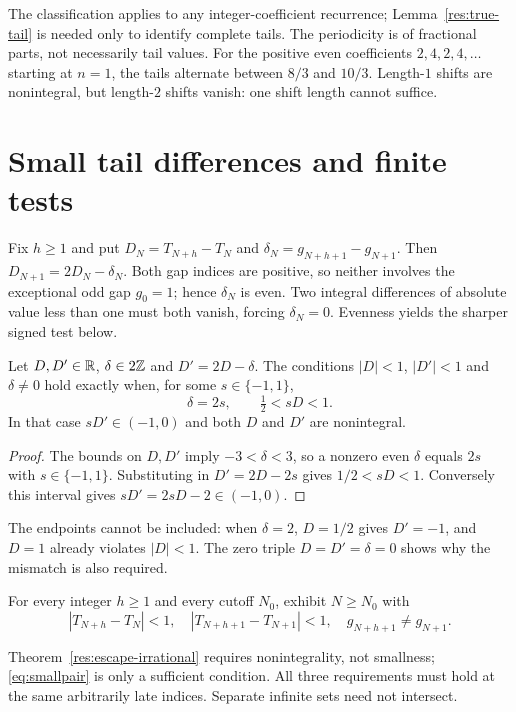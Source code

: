 \documentclass[11pt]{article}
\begin{document}
The classification applies to any integer-coefficient recurrence;
Lemma~\ref{res:true-tail} is needed only to identify complete tails.
The periodicity is of fractional parts, not necessarily tail values.
For the positive even coefficients $2,4,2,4,\ldots$ starting at $n=1$,
the tails alternate between $8/3$ and $10/3$.  Length-$1$ shifts are
nonintegral, but length-$2$ shifts vanish: one shift length cannot suffice.

\section{Small tail differences and finite tests}\label{sec:local-certificate}
Fix $h\ge1$ and put $D_N=T_{N+h}-T_N$ and
$\delta_N=g_{N+h+1}-g_{N+1}$.  Then
$D_{N+1}=2D_N-\delta_N$.  Both gap indices are positive, so neither
involves the exceptional odd gap $g_0=1$; hence $\delta_N$ is even.
Two integral differences of absolute value less than one must both
vanish, forcing $\delta_N=0$.  Evenness yields the sharper signed test below.

\begin{proposition}\label{res:signedwindow}
Let $D,D'\in\mathbb{R}$, $\delta\in2\mathbb{Z}$ and $D'=2D-\delta$.
The conditions $|D|<1$, $|D'|<1$ and $\delta\ne0$ hold exactly when,
for some $s\in\{-1,1\}$,
\[
 \delta=2s,\qquad \tfrac12<sD<1.
\]
In that case $sD'\in(-1,0)$ and both $D$ and $D'$ are nonintegral.
\end{proposition}
\begin{proof}
The bounds on $D,D'$ imply $-3<\delta<3$, so a nonzero even $\delta$
equals $2s$ with $s\in\{-1,1\}$.  Substituting in $D'=2D-2s$ gives
$1/2<sD<1$.  Conversely this interval gives $sD'=2sD-2\in(-1,0)$.
\end{proof}
The endpoints cannot be included: when $\delta=2$, $D=1/2$ gives
$D'=-1$, and $D=1$ already violates $|D|<1$.  The zero triple
$D=D'=\delta=0$ shows why the mismatch is also required.

\begin{problem}\label{prob:smallpair}
For every integer $h\ge1$ and every cutoff $N_0$, exhibit $N\ge N_0$ with
\begin{equation}\label{eq:smallpair}
 |T_{N+h}-T_N|<1,\quad |T_{N+h+1}-T_{N+1}|<1,\quad
 g_{N+h+1}\ne g_{N+1}.
\end{equation}
\end{problem}

Theorem~\ref{res:escape-irrational} requires nonintegrality, not
smallness; \eqref{eq:smallpair} is only a sufficient condition.
All three requirements must hold at the same arbitrarily late
indices.  Separate infinite sets need not intersect.
\end{document}
